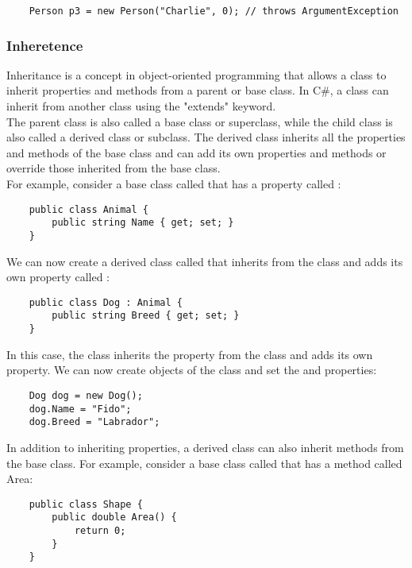 \documentclass{report}
\begin{document}
\begin{verbatim}
    Person p3 = new Person("Charlie", 0); // throws ArgumentException
\end{verbatim}

\subsubsection{Inheretence}
Inheritance is a concept in object-oriented programming that allows a class to inherit properties and methods from a parent or base class. In C\#, a class can inherit from another class using the "extends" keyword.\\

The parent class is also called a base class or superclass, while the child class is also called a derived class or subclass. The derived class inherits all the properties and methods of the base class and can add its own properties and methods or override those inherited from the base class.\\

For example, consider a base class called  that has a property called :

\begin{verbatim}
    public class Animal {
        public string Name { get; set; }
    }
\end{verbatim}

We can now create a derived class called  that inherits from the  class and adds its own property called :
\begin{verbatim}
    public class Dog : Animal {
        public string Breed { get; set; }
    }
\end{verbatim}

In this case, the  class inherits the  property from the  class and adds its own  property. We can now create objects of the  class and set the  and  properties:
\begin{verbatim}
    Dog dog = new Dog();
    dog.Name = "Fido";
    dog.Breed = "Labrador";
\end{verbatim}

In addition to inheriting properties, a derived class can also inherit methods from the base class. For example, consider a base class called  that has a method called Area:
\begin{verbatim}
    public class Shape {
        public double Area() {
            return 0;
        }
    }
\end{verbatim}
\end{document}
